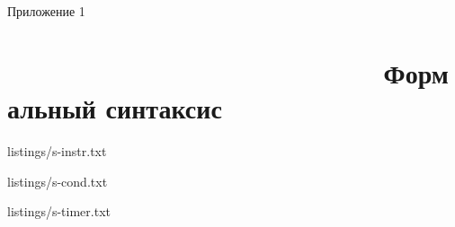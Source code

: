 \begin{flushright}
	Приложение 1
\end{flushright}
\setcounter{secnumdepth}{0}
\section[Приложение 1. Формальный синтаксис]{                          Формальный синтаксис}


\renewcommand{\thelstlisting}{П1.\arabic{lstlisting}}
\setcounter{lstlisting}{0}


{listings/s-instr.txt}


{listings/s-cond.txt}


{listings/s-timer.txt}

